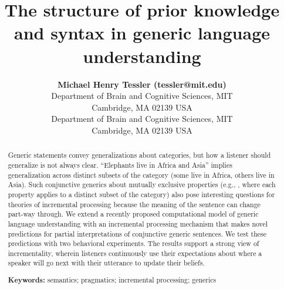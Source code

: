 \documentclass[10pt,letterpaper]{article}
\title{The structure of prior knowledge and syntax in generic language understanding}
\author{{\large \bf Michael Henry Tessler (tessler@mit.edu)} \\
  Department of Brain and Cognitive Sciences, MIT \\
  Cambridge, MA 02139 USA
  \AND {\large \bf Roger Levy (rplevy@mit.edu)} \\
  Department of Brain and Cognitive Sciences, MIT \\
  Cambridge, MA 02139 USA}
\begin{document}
\maketitle


\begin{abstract}


Generic statements convey generalizations about categories, but  how a listener should generalize is not always clear.  
``Elephants live in Africa and Asia'' implies generalization across distinct subsets of the category (some live in Africa, others live in Asia).
Such conjunctive generics about mutually exclusive properties (e.g., , where each property applies to a distinct subset of the category) also pose interesting questions for theories of incremental processing because the meaning of the sentence can change part-way through. 
We extend a recently proposed computational model of generic language understanding with an incremental processing mechanism that makes novel predictions for partial interpretations of conjunctive generic sentences.
We test these predictions with two behavioral experiments. The results support a strong view of incrementality, wherein listeners  continuously use their expectations about where a speaker will go next with their utterance to update their beliefs.



\textbf{Keywords:} 
semantics; pragmatics; incremental processing; generics
\end{abstract}
\end{document}
